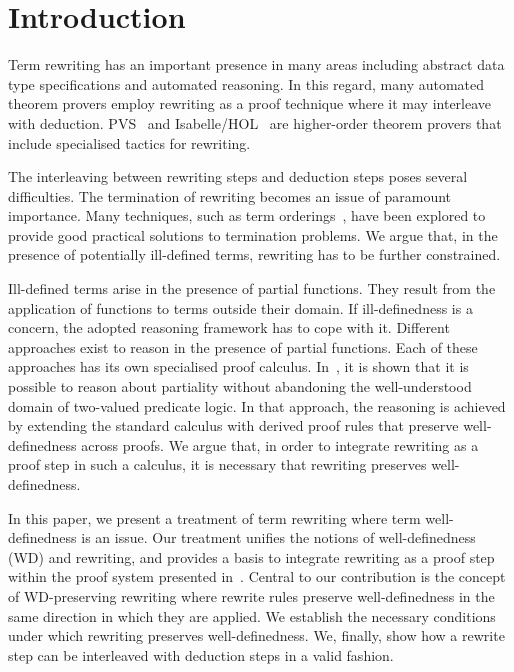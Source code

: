 \documentclass[copyright]{eptcs}
\begin{document}
\section{Introduction}
Term rewriting has an important presence in many areas including abstract data type specifications and automated reasoning. In this regard, many automated theorem provers employ rewriting as a proof technique where it may interleave with deduction. PVS~\cite{886667} and Isabelle/HOL~\cite{513715} are higher-order theorem provers that include specialised tactics for rewriting.
\par
The interleaving between rewriting steps and deduction steps poses several difficulties. The termination of rewriting becomes an issue of paramount importance. Many techniques, such as term orderings~\cite{280474}, have been explored to provide good practical solutions to termination problems. We argue that, in the presence of potentially ill-defined terms, rewriting has to be further constrained.
\par
Ill-defined terms arise in the presence of partial functions. They result from the application of functions to terms outside their domain. If ill-definedness is a concern, the adopted reasoning framework has to cope with it. Different approaches exist to reason in the presence of partial functions. Each of these approaches has its own specialised proof calculus. In~\cite{icfemMehta08}, it is shown that it is possible to reason about partiality without abandoning the well-understood domain of two-valued predicate logic. In that approach, the reasoning is achieved by extending the standard calculus with derived proof rules that preserve well-definedness across proofs. We argue that, in order to integrate rewriting as a proof step in such a calculus, it is necessary that rewriting preserves well-definedness.
\par
In this paper, we present a treatment of term rewriting where term well-definedness is an issue. Our treatment unifies the notions of well-definedness (WD) and rewriting, and provides a basis to integrate rewriting as a proof step within the proof system presented in~\cite{icfemMehta08}. Central to our contribution is the concept of WD-preserving rewriting where rewrite rules preserve well-definedness in the same direction in which they are applied. We establish the necessary conditions under which rewriting preserves well-definedness. We, finally, show how a rewrite step can be interleaved with deduction steps in a valid fashion.
\end{document}
